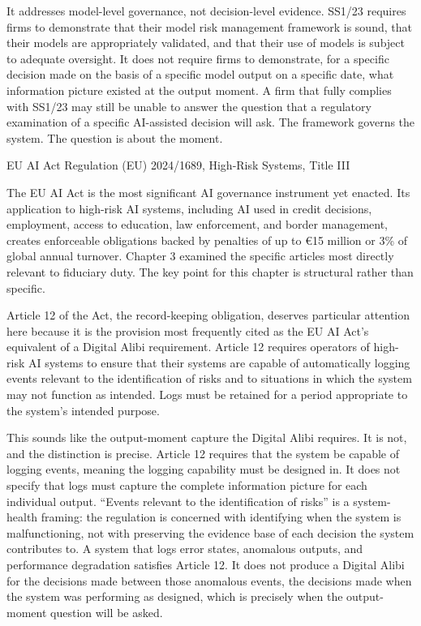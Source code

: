 It addresses model-level governance, not decision-level evidence. SS1/23 requires firms to demonstrate that their model risk management framework is sound, that their models are appropriately validated, and that their use of models is subject to adequate oversight. It does not require firms to demonstrate, for a specific decision made on the basis of a specific model output on a specific date, what information picture existed at the output moment. A firm that fully complies with SS1/23 may still be unable to answer the question that a regulatory examination of a specific AI-assisted decision will ask. The framework governs the system. The question is about the moment.

EU AI Act Regulation (EU) 2024/1689, High-Risk Systems, Title III

The EU AI Act is the most significant AI governance instrument yet enacted. Its application to high-risk AI systems, including AI used in credit decisions, employment, access to education, law enforcement, and border management, creates enforceable obligations backed by penalties of up to €15 million or 3\% of global annual turnover. Chapter 3 examined the specific articles most directly relevant to fiduciary duty. The key point for this chapter is structural rather than specific.

Article 12 of the Act, the record-keeping obligation, deserves particular attention here because it is the provision most frequently cited as the EU AI Act's equivalent of a Digital Alibi requirement. Article 12 requires operators of high-risk AI systems to ensure that their systems are capable of automatically logging events relevant to the identification of risks and to situations in which the system may not function as intended. Logs must be retained for a period appropriate to the system's intended purpose.

This sounds like the output-moment capture the Digital Alibi requires. It is not, and the distinction is precise. Article 12 requires that the system be capable of logging events, meaning the logging capability must be designed in. It does not specify that logs must capture the complete information picture for each individual output. ``Events relevant to the identification of risks'' is a system-health framing: the regulation is concerned with identifying when the system is malfunctioning, not with preserving the evidence base of each decision the system contributes to. A system that logs error states, anomalous outputs, and performance degradation satisfies Article 12. It does not produce a Digital Alibi for the decisions made between those anomalous events, the decisions made when the system was performing as designed, which is precisely when the output-moment question will be asked.

